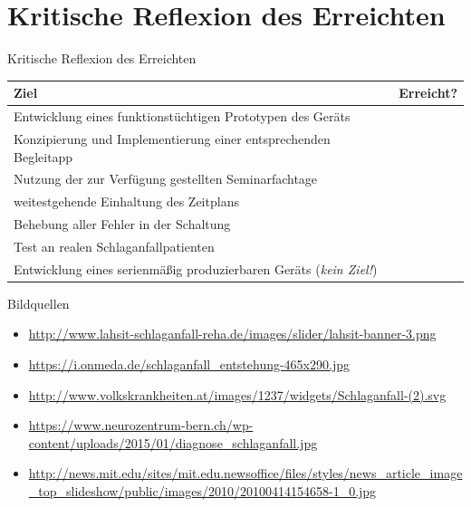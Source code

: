 \documentclass[hyphens]{beamer}
\newcommand{\xmark}{\ding{55}}
\begin{document}
 \section*{Kritische Reflexion des Erreichten}
 \begin{frame}{Kritische Reflexion des Erreichten}
 	\begin{table}
 		\begin{tabularx}{\textwidth}{|Z|c|}
 			\hline
 			\textbf{Ziel} & \textbf{Erreicht?} \\
 			\hline
 			\hline
 			Entwicklung eines funktionstüchtigen Prototypen des Geräts & \checkmark \\
 			\hline
 			Konzipierung und Implementierung einer entsprechenden Begleitapp & \checkmark \\
 			\hline
 			Nutzung der zur Verfügung gestellten Seminarfachtage  & \checkmark \\
 			\hline
 			weitestgehende Einhaltung des Zeitplans & \checkmark \\
 			\hline
 			Behebung aller Fehler in der Schaltung & \xmark \\ 
 			\hline
 			Test an realen Schlaganfallpatienten & \xmark \\ 
 			\hline
 			Entwicklung eines serienmäßig produzierbaren Geräts (\emph{kein Ziel!}) & \xmark \\ 
 			\hline
 		\end{tabularx}
 	\end{table}
 \end{frame}

 \begin{frame}{Bildquellen}
 \begin{itemize}
 \item \small{\url{http://www.lahsit-schlaganfall-reha.de/images/slider/lahsit-banner-3.png}}
 \item \small{\url{https://i.onmeda.de/schlaganfall_entstehung-465x290.jpg}}
 \item \small{\url{http://www.volkskrankheiten.at/images/1237/widgets/Schlaganfall-(2).svg}}
 \item  \small{\url{https://www.neurozentrum-bern.ch/wp-content/uploads/2015/01/diagnose_schlaganfall.jpg}}
 \item  \small{\url{http://news.mit.edu/sites/mit.edu.newsoffice/files/styles/news_article_image_top_slideshow/public/images/2010/20100414154658-1_0.jpg}}
 \end{itemize}
 \end{frame}
\end{document}
